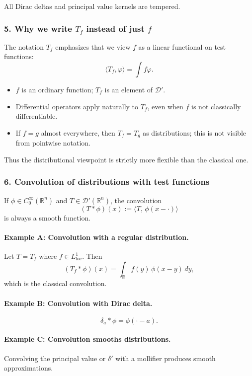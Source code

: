 \documentclass[12pt,a4paper]{article}
\theoremstyle{plain}
\theoremstyle{definition}
\theoremstyle{remark}
\theoremstyle{remark}
\begin{document}
All Dirac deltas and principal value kernels are tempered.

\subsubsection*{5. Why we write $T_f$ instead of just $f$}

The notation $T_f$ emphasizes that we view $f$ as a linear functional on
test functions:
\[
\langle T_f,\varphi\rangle = \int f\varphi.
\]

\begin{itemize}
	\item $f$ is an ordinary function; $T_f$ is an element of $\mathcal{D}'$.
	\item Differential operators apply naturally to $T_f$, even when $f$ is not
	classically differentiable.
	\item If $f=g$ almost everywhere, then $T_f=T_g$ as distributions; this is
	not visible from pointwise notation.
\end{itemize}

Thus the distributional viewpoint is strictly more flexible than the
classical one.

\subsubsection*{6. Convolution of distributions with test functions}

If $\phi\in C_0^\infty(\mathbb{R}^n)$ and $T\in\mathcal{D}'(\mathbb{R}^n)$, the
convolution
\[
\boxed{
	(T*\phi)(x) := \langle T,\,\phi(x-\cdot)\rangle
}
\]
is always a smooth function.

\paragraph{Example A: Convolution with a regular distribution.}
Let $T=T_f$ where $f\in L^1_{\mathrm{loc}}$. Then
\[
(T_f*\phi)(x)
= \int_{\mathbb{R}} f(y)\,\phi(x-y)\,dy,
\]
which is the classical convolution.

\paragraph{Example B: Convolution with Dirac delta.}
\[
\delta_a * \phi = \phi(\cdot - a).
\]

\paragraph{Example C: Convolution smooths distributions.}
Convolving the principal value or $\delta'$ with a mollifier produces
smooth approximations.
\end{document}
